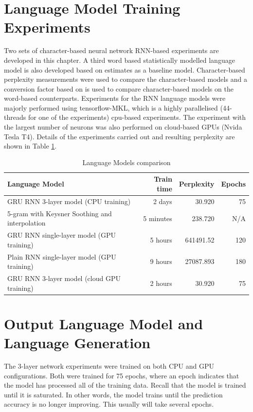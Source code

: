 \section{Language Model Training Experiments}
Two sets of character-based neural network RNN-based experiments are developed in this chapter.  A third word based statistically modelled language model is also developed based on  \cite{Heafield-estimate} estimates as a baseline model. Character-based perplexity measurements were used to compare the character-based models and a conversion factor based on \citep{hwang2017character} is used to compare character-based models on the word-based counterparts.  Experiments for the RNN language models were majorly performed using tensorflow-MKL, which is a highly parallelised (44-threads for one of the experiments) cpu-based experiments.  The experiment with the largest number of neurons was also performed on cloud-based GPUs (Nvida Tesla T4).  Details of the experiments carried out and resulting perplexity are shown in Table \ref{tab6_1:LMX}.

\begin{table}
  \caption{Language Models comparison}
  \label{tab6_1:LMX}
\begin{tabular}{lrrr}
\toprule
Language Model & Train time & Perplexity & Epochs  \\
\midrule
GRU RNN 3-layer model (CPU training) & ~ 2 days & 30.920 & 75 \\
5-gram with Keysner Soothing and interpolation & 5 minutes & 238.720 & N/A \\
GRU RNN single-layer model (GPU training) & ~ 5 hours & 641491.52 & 120 \\
Plain RNN single-layer model (GPU training) & ~ 9 hours & 27087.893 & 180 \\
GRU RNN 3-layer model (cloud GPU training) & ~ 2 hours & 30.920 & 75 \\
\bottomrule
\end{tabular}
\end{table}

\stopblue


\section{Output Language Model and Language Generation}\label{sec6_4}
\startblue
The 3-layer network experiments were trained on both CPU and GPU configurations. Both were trained for 75 epochs, where an epoch indicates that the model has processed all of the training data.  Recall that the model  is trained until it is saturated.  In other words, the model trains until the prediction accuracy is no longer improving.   This usually will take several epochs.

